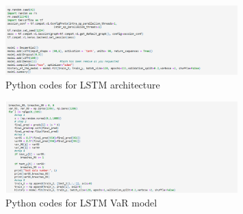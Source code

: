 \documentclass[a4paper,11pt,oneside]{book}
\begin{document}
\begin{appendices}
	\begin{figure}[!h]
		\centering
		\includegraphics[width=0.8\textwidth]{figures/code3}
		\caption{Python codes for LSTM architecture}
	\end{figure}
	 \vspace{50mm}
	\begin{figure}[!h]
		\centering
		\includegraphics[width=0.8\textwidth]{figures/code4}
		\caption{Python codes for LSTM VaR model}
	\end{figure}

	
	
\end{appendices}














\end{document}
